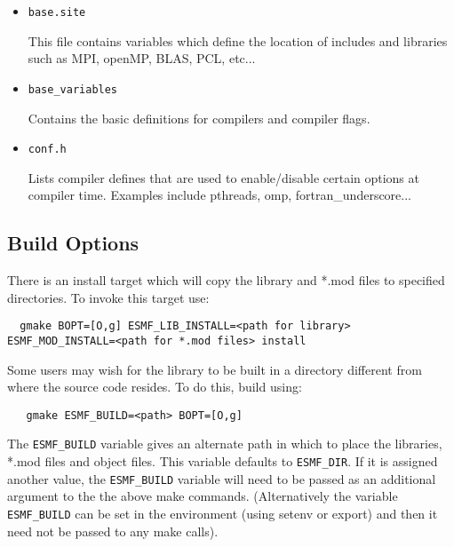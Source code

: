 \begin{itemize}

\item{{\tt base.site}}

This file contains variables which define the location of includes and
libraries such as MPI, openMP, BLAS, PCL, etc...

\item{{\tt base\_variables}}

Contains the basic definitions for compilers and compiler flags.

\item{{\tt conf.h}}

Lists compiler defines that are used to enable/disable certain options at
compiler time.  Examples include pthreads, omp, fortran\_underscore...

\end{itemize}

\subsection{Build Options}
\label{BuildOptions}

There is an install target which will copy the library and *.mod files to
specified directories.  To invoke this target use:
\begin{verbatim}
  gmake BOPT=[O,g] ESMF_LIB_INSTALL=<path for library> ESMF_MOD_INSTALL=<path for *.mod files> install 
\end{verbatim}

Some users may wish for the library to be built in a directory different from 
where the source code resides.  To do this, build using:
\begin{verbatim}
   gmake ESMF_BUILD=<path> BOPT=[O,g]
\end{verbatim}

The {\tt ESMF\_BUILD} variable gives an alternate path in which to place the libraries,
*.mod files and object files.  This variable defaults to {\tt ESMF\_DIR}.  If it is 
assigned another value, the {\tt ESMF\_BUILD} variable will need to be passed as
an additional argument to the the above make commands.  (Alternatively the variable
{\tt ESMF\_BUILD} can be set in the environment (using setenv or export) and then it 
need not be passed to any make calls).








